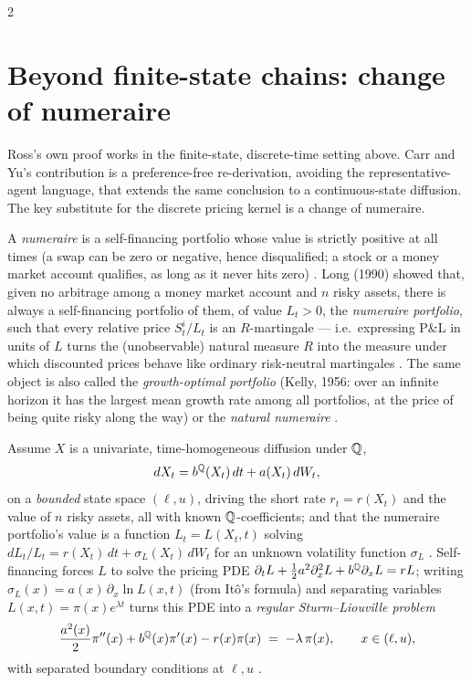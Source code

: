\begin{paracol}{2}
\section{Beyond finite-state chains: change of numeraire}\label{ch25:sec-diffusion}

Ross's own proof works in the finite-state, discrete-time setting above. Carr and Yu's contribution is a
preference-free re-derivation, avoiding the representative-agent language, that extends the same conclusion
to a continuous-state diffusion. The key substitute for the discrete pricing kernel is a change of
numeraire.

\begin{definition}\label{ch25:def-numeraire}
A \emph{numeraire} is a self-financing portfolio whose value is strictly positive at all times (a swap can
be zero or negative, hence disqualified; a stock or a money market account qualifies, as long as it never
hits zero) . Long (1990) showed that, given no arbitrage among a money market account and
$n$ risky assets, there is always a self-financing portfolio of them, of value $L_t>0$, the \emph{numeraire
portfolio}, such that every relative price $S^i_t/L_t$ is an $R$-martingale --- i.e.\ expressing P\&L in
units of $L$ turns the (unobservable) natural measure $R$ into the measure under which discounted prices
behave like ordinary risk-neutral martingales . The same object is also called the
\emph{growth-optimal portfolio} (Kelly, 1956: over an infinite horizon it has the largest mean growth rate
among all portfolios, at the price of being quite risky along the way) or the \emph{natural numeraire}
.
\end{definition}

Assume $X$ is a univariate, time-homogeneous diffusion under $\mathbb{Q}$,
\[
  dX_t = b^{\mathbb{Q}}(X_t)\,dt + a(X_t)\,dW_t,
\]
on a \emph{bounded} state space $(\ell,u)$, driving the short rate $r_t=r(X_t)$ and the value of $n$ risky
assets, all with known $\mathbb{Q}$-coefficients; and that the numeraire portfolio's value is a function
$L_t=L(X_t,t)$ solving $dL_t/L_t=r(X_t)\,dt+\sigma_L(X_t)\,dW_t$ for an unknown volatility function
$\sigma_L$ . Self-financing forces $L$ to solve the pricing PDE
$\partial_tL+\tfrac12a^2\partial_x^2L+b^{\mathbb{Q}}\partial_xL=rL$; writing $\sigma_L(x)=a(x)\,\partial_x\ln L(x,t)$
(from It\^o's formula) and separating variables $L(x,t)=\pi(x)e^{\lambda t}$ turns this PDE into a
\emph{regular Sturm--Liouville problem}
\begin{equation}\label{ch25:eq-sl}
  \frac{a^2(x)}{2}\pi''(x) + b^{\mathbb{Q}}(x)\pi'(x) - r(x)\pi(x) \;=\; -\lambda\,\pi(x), \qquad x\in(\ell,u),
\end{equation}
with separated boundary conditions at $\ell,u$ .


\end{paracol}
